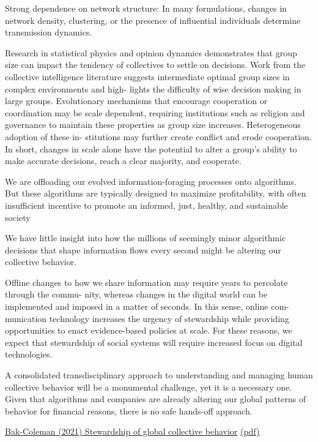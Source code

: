 \documentclass[
]{book}
\begin{document}
Strong dependence on network structure: In
many formulations, changes in network density, clustering, or the
presence of influential individuals determine transmission dynamics.

Research in statistical
physics and opinion dynamics demonstrates that group size can
impact the tendency of collectives to settle on decisions.
Work from the collective intelligence literature suggests
intermediate optimal group sizes in complex environments and high-
lights the difficulty of wise decision making in large groups.
Evolutionary mechanisms that encourage cooperation or
coordination may be scale dependent, requiring institutions such
as religion and governance to maintain these properties as group
size increases. Heterogeneous adoption of these in-
stitutions may further create conflict and erode cooperation.
In short, changes in scale alone have the potential to alter a
group's ability to make accurate decisions, reach a clear majority,
and cooperate.

We are offloading our evolved information-foraging
processes onto algorithms. But these algorithms are typically
designed to maximize profitability, with often insufficient incentive to
promote an informed, just, healthy, and sustainable society

We have little insight into how the millions of seemingly minor
algorithmic decisions that shape information flows every second
might be altering our collective behavior.

Offline changes to how we share
information may require years to percolate through the commu-
nity, whereas changes in the digital world can be implemented
and imposed in a matter of seconds. In this sense, online com-
munication technology increases the urgency of stewardship
while providing opportunities to enact evidence-based policies at
scale. For these reasons, we expect that stewardship of social
systems will require increased focus on digital technologies.

A consolidated transdisciplinary approach to understanding
and managing human collective behavior will be a monumental
challenge, yet it is a necessary one. Given that algorithms and
companies are already altering our global patterns of behavior for
financial reasons, there is no safe hands-off approach.

\href{https://www.pnas.org/content/118/27/e2025764118}{Bak-Coleman (2021) Stewardship of global collective behavior}
\href{pdf/Bak-Coleman_2021_Stewardship_Global_Collective_Behavior.pdf}{(pdf)}
\end{document}
